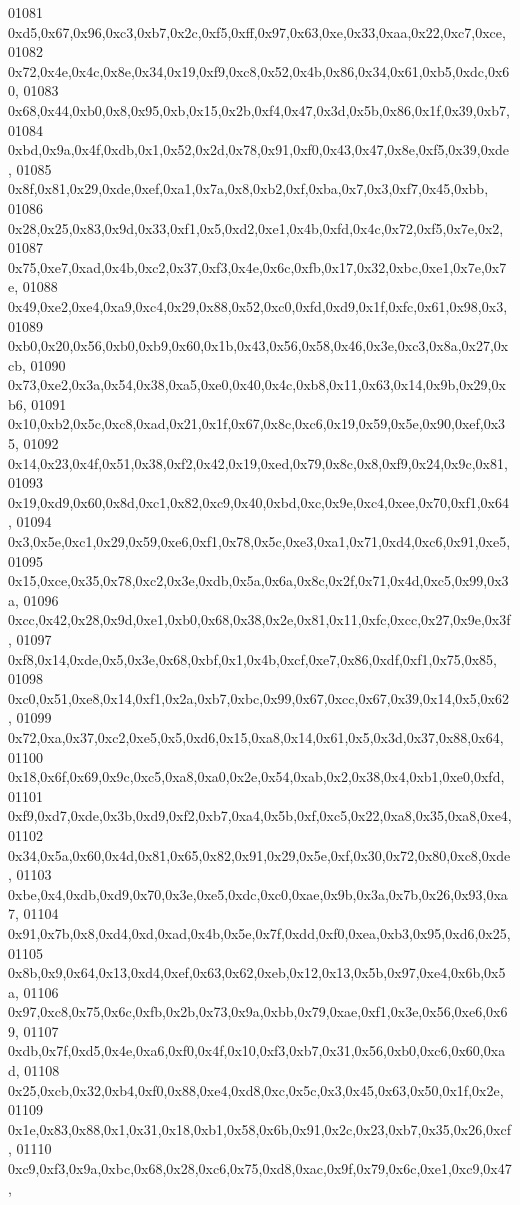 \begin{DoxyCode}
01081   0xd5,0x67,0x96,0xc3,0xb7,0x2c,0xf5,0xff,0x97,0x63,0xe,0x33,0xaa,0x22,0xc7,0xce,
01082   0x72,0x4e,0x4c,0x8e,0x34,0x19,0xf9,0xc8,0x52,0x4b,0x86,0x34,0x61,0xb5,0xdc,0x60,
01083   0x68,0x44,0xb0,0x8,0x95,0xb,0x15,0x2b,0xf4,0x47,0x3d,0x5b,0x86,0x1f,0x39,0xb7,
01084   0xbd,0x9a,0x4f,0xdb,0x1,0x52,0x2d,0x78,0x91,0xf0,0x43,0x47,0x8e,0xf5,0x39,0xde,
01085   0x8f,0x81,0x29,0xde,0xef,0xa1,0x7a,0x8,0xb2,0xf,0xba,0x7,0x3,0xf7,0x45,0xbb,
01086   0x28,0x25,0x83,0x9d,0x33,0xf1,0x5,0xd2,0xe1,0x4b,0xfd,0x4c,0x72,0xf5,0x7e,0x2,
01087   0x75,0xe7,0xad,0x4b,0xc2,0x37,0xf3,0x4e,0x6c,0xfb,0x17,0x32,0xbc,0xe1,0x7e,0x7e,
01088   0x49,0xe2,0xe4,0xa9,0xc4,0x29,0x88,0x52,0xc0,0xfd,0xd9,0x1f,0xfc,0x61,0x98,0x3,
01089   0xb0,0x20,0x56,0xb0,0xb9,0x60,0x1b,0x43,0x56,0x58,0x46,0x3e,0xc3,0x8a,0x27,0xcb,
01090   0x73,0xe2,0x3a,0x54,0x38,0xa5,0xe0,0x40,0x4c,0xb8,0x11,0x63,0x14,0x9b,0x29,0xb6,
01091   0x10,0xb2,0x5c,0xc8,0xad,0x21,0x1f,0x67,0x8c,0xc6,0x19,0x59,0x5e,0x90,0xef,0x35,
01092   0x14,0x23,0x4f,0x51,0x38,0xf2,0x42,0x19,0xed,0x79,0x8c,0x8,0xf9,0x24,0x9c,0x81,
01093   0x19,0xd9,0x60,0x8d,0xc1,0x82,0xc9,0x40,0xbd,0xc,0x9e,0xc4,0xee,0x70,0xf1,0x64,
01094   0x3,0x5e,0xc1,0x29,0x59,0xe6,0xf1,0x78,0x5c,0xe3,0xa1,0x71,0xd4,0xc6,0x91,0xe5,
01095   0x15,0xce,0x35,0x78,0xc2,0x3e,0xdb,0x5a,0x6a,0x8c,0x2f,0x71,0x4d,0xc5,0x99,0x3a,
01096   0xcc,0x42,0x28,0x9d,0xe1,0xb0,0x68,0x38,0x2e,0x81,0x11,0xfc,0xcc,0x27,0x9e,0x3f,
01097   0xf8,0x14,0xde,0x5,0x3e,0x68,0xbf,0x1,0x4b,0xcf,0xe7,0x86,0xdf,0xf1,0x75,0x85,
01098   0xc0,0x51,0xe8,0x14,0xf1,0x2a,0xb7,0xbc,0x99,0x67,0xcc,0x67,0x39,0x14,0x5,0x62,
01099   0x72,0xa,0x37,0xc2,0xe5,0x5,0xd6,0x15,0xa8,0x14,0x61,0x5,0x3d,0x37,0x88,0x64,
01100   0x18,0x6f,0x69,0x9c,0xc5,0xa8,0xa0,0x2e,0x54,0xab,0x2,0x38,0x4,0xb1,0xe0,0xfd,
01101   0xf9,0xd7,0xde,0x3b,0xd9,0xf2,0xb7,0xa4,0x5b,0xf,0xc5,0x22,0xa8,0x35,0xa8,0xe4,
01102   0x34,0x5a,0x60,0x4d,0x81,0x65,0x82,0x91,0x29,0x5e,0xf,0x30,0x72,0x80,0xc8,0xde,
01103   0xbe,0x4,0xdb,0xd9,0x70,0x3e,0xe5,0xdc,0xc0,0xae,0x9b,0x3a,0x7b,0x26,0x93,0xa7,
01104   0x91,0x7b,0x8,0xd4,0xd,0xad,0x4b,0x5e,0x7f,0xdd,0xf0,0xea,0xb3,0x95,0xd6,0x25,
01105   0x8b,0x9,0x64,0x13,0xd4,0xef,0x63,0x62,0xeb,0x12,0x13,0x5b,0x97,0xe4,0x6b,0x5a,
01106   0x97,0xc8,0x75,0x6c,0xfb,0x2b,0x73,0x9a,0xbb,0x79,0xae,0xf1,0x3e,0x56,0xe6,0x69,
01107   0xdb,0x7f,0xd5,0x4e,0xa6,0xf0,0x4f,0x10,0xf3,0xb7,0x31,0x56,0xb0,0xc6,0x60,0xad,
01108   0x25,0xcb,0x32,0xb4,0xf0,0x88,0xe4,0xd8,0xc,0x5c,0x3,0x45,0x63,0x50,0x1f,0x2e,
01109   0x1e,0x83,0x88,0x1,0x31,0x18,0xb1,0x58,0x6b,0x91,0x2c,0x23,0xb7,0x35,0x26,0xcf,
01110   0xc9,0xf3,0x9a,0xbc,0x68,0x28,0xc6,0x75,0xd8,0xac,0x9f,0x79,0x6c,0xe1,0xc9,0x47,

\end{DoxyCode}
